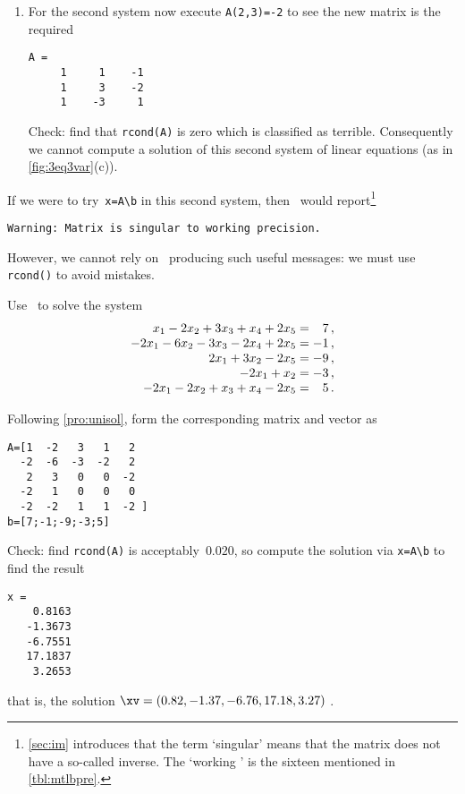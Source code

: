 \begin{example}
\begin{solution}
\begin{enumerate}
\item For the second system now execute \verb|A(2,3)=-2| to see the new matrix is the required
\begin{verbatim}
A =
     1     1    -1
     1     3    -2
     1    -3     1
\end{verbatim}
Check: find that \verb|rcond(A)| is zero which is classified as terrible.
Consequently we cannot compute a solution of this second system of linear equations (as in \autoref{fig:3eq3var}(c)).
\end{enumerate}
If we were to try~\verb|x=A\b| in this second system, then \script\ would report\footnote{\autoref{sec:im} introduces that the term `singular' means that the matrix does not have a so-called inverse.  The `working ' is the sixteen  mentioned in \autoref{tbl:mtlbpre}.}%
\begin{verbatim}
Warning: Matrix is singular to working precision. 
\end{verbatim}
However, we cannot rely on \script\ producing such useful messages: we must use \verb|rcond()| to avoid mistakes.
\end{solution}
\end{example}



\begin{example} \label{eg:5eqns5vars}
Use \script\ to solve the system
\begin{equation*}
\begin{array}{r@{{}={}}r}
x_1-2x_2+3x_3+x_4+2x_5&7\,,\\
-2x_1-6x_2-3x_3-2x_4+2x_5&-1\,,\\
2x_1+3x_2-2x_5&-9\,,\\
-2x_1+x_2&-3\,,\\
-2x_1-2x_2+x_3+x_4-2x_5&5\,.
\end{array}
\end{equation*}

\begin{solution} 
Following \autoref{pro:unisol}, form the corresponding matrix and vector as
\begin{verbatim}
A=[1  -2   3   1   2
  -2  -6  -3  -2   2
   2   3   0   0  -2
  -2   1   0   0   0
  -2  -2   1   1  -2 ]
b=[7;-1;-9;-3;5]
\end{verbatim}
Check: find \verb|rcond(A)| is acceptably~\(0.020\), so compute the solution via \verb|x=A\b| to find the result
\setbox\ajrqrbox\hbox{}%
\marginpar{\usebox{\ajrqrbox\\[2ex]}}%
\begin{verbatim}
x =
    0.8163
   -1.3673
   -6.7551
   17.1837
    3.2653
\end{verbatim}
that is, the solution \(\xv=(0.82,-1.37,-6.76,17.18,3.27)\) \twodp.
\end{solution}
\end{example}


